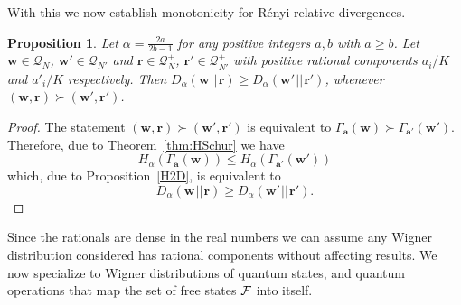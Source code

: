 \documentclass[
twocolumn,
superscriptaddress
]{revtex4-1}
\newtheorem{proposition}[theorem]{Proposition}
\def\bma{\boldsymbol{a}}
\def\r{\boldsymbol{r}}
\def\w{\boldsymbol{w}}
\def\F{{\cal F}}
\begin{document}
With this we now establish monotonicity for R\'{e}nyi relative divergences.
\begin{proposition}\label{DSchur}
	Let $\alpha = \frac{2a}{2b-1}$ for any positive integers $a,b$ with $a \geq b$. Let $\w \in \mathcal{Q}_N$, $\w' \in \mathcal{Q}_{N'}$ and $\r \in  \mathcal{Q}^+_N$, $\r' \in \mathcal{Q}^+_{N'}$ with positive rational components $a_i/K$ and $a'_i/K$ respectively.
	Then $D_\alpha(\w \hspace{1pt}||\hspace{1pt} \r) \geq D_\alpha(\w' \hspace{1pt}||\hspace{1pt} \r')$, whenever $(\w, \r) \succ (\w', \r')$.
\end{proposition}
\begin{proof}
	The statement $(\w, \r) \succ (\w', \r')$ is equivalent to $\Gamma_{\bma}(\w) \succ \Gamma_{\bma'}(\w')$.
	Therefore, due to Theorem~\ref{thm:HSchur} we have
	\begin{equation}
		H_\alpha(\Gamma_{\bma}(\w)) \leq H_\alpha(\Gamma_{\bma'}(\w'))
	\end{equation}
	which, due to Proposition~\ref{H2D}, is equivalent to
	\begin{equation}
		D_\alpha(\w \hspace{1pt}||\hspace{1pt} \r) \geq D_\alpha(\w' \hspace{1pt}||\hspace{1pt} \r').
	\end{equation}
\end{proof}
Since the rationals are dense in the real numbers we can assume any Wigner distribution considered has rational components without affecting results.
We now specialize to Wigner distributions of quantum states, and quantum operations that map the set of free states $\F$ into itself.
\end{document}
